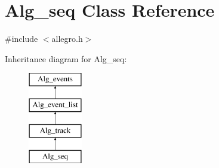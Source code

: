 \hypertarget{class_alg__seq}{}\section{Alg\+\_\+seq Class Reference}
\label{class_alg__seq}


{\ttfamily \#include $<$allegro.\+h$>$}

Inheritance diagram for Alg\+\_\+seq\+:\begin{figure}[H]
\begin{center}
\leavevmode
\includegraphics[height=4.000000cm]{class_alg__seq}
\end{center}
\end{figure}
